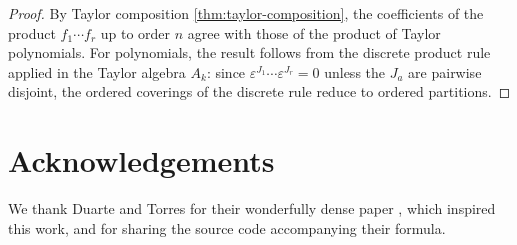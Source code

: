 \documentclass[10pt,a4paper]{article}
\theoremstyle{plain}
\theoremstyle{definition}
\newcommand{\1}{\mathbb{1}} %
\newcommand{\eps}{\varepsilon} %
\begin{document}
\begin{proof}

By Taylor composition \ref{thm:taylor-composition}, the coefficients of
the product \(f_1 \cdots f_r\) up to order \(n\) agree with those of the
product of Taylor polynomials. For polynomials, the result follows from
the discrete product rule applied in the Taylor algebra \(A_k\): since
\(\eps^{J_1} \cdots \eps^{J_r} = 0\) unless the \(J_a\) are pairwise
disjoint, the ordered coverings of the discrete rule reduce to ordered
partitions.

\end{proof}

\section{Acknowledgements}\label{acknowledgements}

We thank Duarte and Torres for their wonderfully dense paper
\citep{DT2008}, which inspired this work, and for sharing the source
code accompanying their formula.




\end{document}
